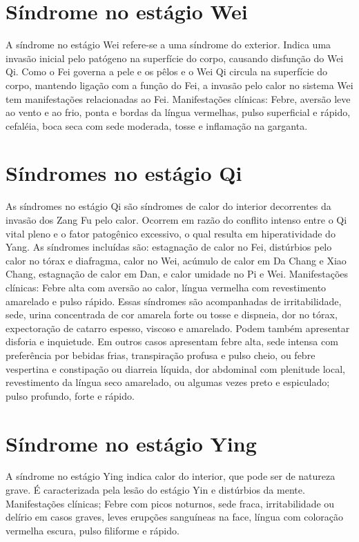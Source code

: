 \documentclass[12pt,oneside,a4paper]{book} %
\begin{document}
\section{Síndrome no estágio Wei}
A síndrome no estágio Wei refere-se a uma síndrome do exterior. Indica uma invasão inicial pelo patógeno na superfície do corpo, causando disfunção do Wei Qi. Como o Fei governa a pele e os pêlos e o Wei Qi circula na superfície do corpo, mantendo ligação com a função do Fei, a invasão pelo calor no sistema Wei tem manifestações relacionadas ao Fei.
Manifestações clínicas: Febre, aversão leve ao vento e ao frio, ponta e bordas da língua vermelhas, pulso superficial e rápido, cefaléia, boca seca com sede moderada, tosse e inflamação na garganta.

\section{Síndromes no estágio Qi}
As síndromes no estágio Qi são síndromes de calor do interior decorrentes da invasão dos Zang Fu pelo calor. Ocorrem em razão do conflito intenso entre o Qi vital pleno e o fator patogênico excessivo, o qual resulta em hiperatividade do Yang. As síndromes incluídas são: estagnação de calor no Fei, distúrbios pelo calor no tórax e diafragma, calor no Wei, acúmulo de calor em Da Chang e Xiao Chang, estagnação de calor em Dan, e calor umidade no Pi e Wei.
Manifestações clínicas: Febre alta com aversão ao calor, língua vermelha com revestimento amarelado e pulso rápido. Essas síndromes são acompanhadas de irritabilidade, sede, urina concentrada de cor amarela forte ou tosse e dispneia, dor no tórax, expectoração de catarro espesso, viscoso e amarelado. Podem também apresentar disforia e inquietude. Em outros casos apresentam febre alta, sede intensa com preferência por bebidas frias, transpiração profusa e pulso cheio, ou febre vespertina e constipação ou diarreia líquida, dor abdominal com plenitude local, revestimento da língua seco amarelado, ou algumas vezes preto e espiculado; pulso profundo, forte e rápido.

\section{Síndrome no estágio Ying}
A síndrome no estágio Ying indica calor do interior, que pode ser de natureza grave. É caracterizada pela lesão do estágio Yin e distúrbios da mente.
Manifestações clínicas; Febre com picos noturnos, sede fraca, irritabilidade ou delírio em casos graves, leves erupções sanguíneas na face, língua com coloração vermelha escura, pulso filiforme e rápido.
\end{document}
